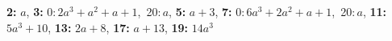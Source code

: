 \textsf{\bfseries 2:} $a$, \textsf{\bfseries 3:} 0:\,$2a^3 + a^2 + a + 1$,\ 20:\,$a$, \textsf{\bfseries 5:} $a + 3$, \textsf{\bfseries 7:} 0:\,$6a^3 + 2a^2 + a + 1$,\ 20:\,$a$, \textsf{\bfseries 11:} $5a^3 + 10$, \textsf{\bfseries 13:} $2a + 8$, \textsf{\bfseries 17:} $a + 13$, \textsf{\bfseries 19:} $14a^3$
